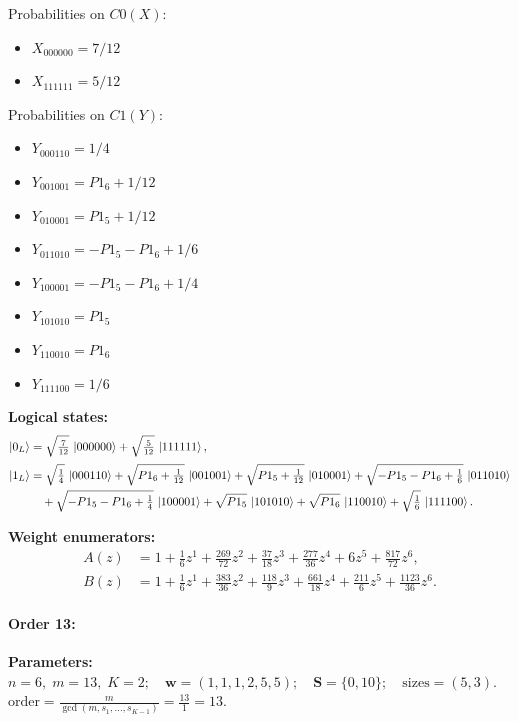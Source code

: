 \documentclass[11pt]{article}
\begin{document}
Probabilities on $C0 (X)$:
\begin{itemize}
    \item $X_{000000} = 7/12$
    \item $X_{111111} = 5/12$
\end{itemize}

Probabilities on $C1 (Y)$:
\begin{itemize}
    \item $Y_{000110} = 1/4$
    \item $Y_{001001} = P1_6 + 1/12$
    \item $Y_{010001} = P1_5 + 1/12$
    \item $Y_{011010} = -P1_5 - P1_6 + 1/6$
    \item $Y_{100001} = -P1_5 - P1_6 + 1/4$
    \item $Y_{101010} = P1_5$
    \item $Y_{110010} = P1_6$
    \item $Y_{111100} = 1/6$
\end{itemize}

\noindent\textbf{Logical states:}
\begin{align*}
\ket{0_L} &= \sqrt{\tfrac{7}{12}}\,\ket{000000} + \sqrt{\tfrac{5}{12}}\,\ket{111111},
\\[2pt]
\ket{1_L} &= \sqrt{\tfrac{1}{4}}\,\ket{000110} + \sqrt{P1_6 + \tfrac{1}{12}}\,\ket{001001} + \sqrt{P1_5 + \tfrac{1}{12}}\,\ket{010001} + \sqrt{-P1_5 - P1_6 + \tfrac{1}{6}}\,\ket{011010}\\
&\quad + \sqrt{-P1_5 - P1_6 + \tfrac{1}{4}}\,\ket{100001} + \sqrt{P1_5}\,\ket{101010} + \sqrt{P1_6}\,\ket{110010} + \sqrt{\tfrac{1}{6}}\,\ket{111100}.
\end{align*}

\noindent\textbf{Weight enumerators:}
\begin{align*}
A(z) &= 1 + \tfrac{1}{6}z^{1} + \tfrac{269}{72}z^{2} + \tfrac{37}{18}z^{3} + \tfrac{277}{36}z^{4} + 6z^{5} + \tfrac{817}{72}z^{6},\\[2pt]
B(z) &= 1 + \tfrac{1}{6}z^{1} + \tfrac{383}{36}z^{2} + \tfrac{118}{9}z^{3} + \tfrac{661}{18}z^{4} + \tfrac{211}{6}z^{5} + \tfrac{1123}{36}z^{6}.
\end{align*}

\paragraph{\textbf{Order 13:}}
\noindent\textbf{Parameters:} $n=6,\; m=13,\; K=2;\quad \mathbf w=(1, 1, 1, 2, 5, 5);\quad \mathbf S=\{0, 10\};\quad \text{sizes}=\left(5, 3\right).$ $\displaystyle \text{order}=\frac{m}{\gcd(m,s_1,\dots,s_{K-1})}=\frac{13}{1}=13.$
\end{document}
